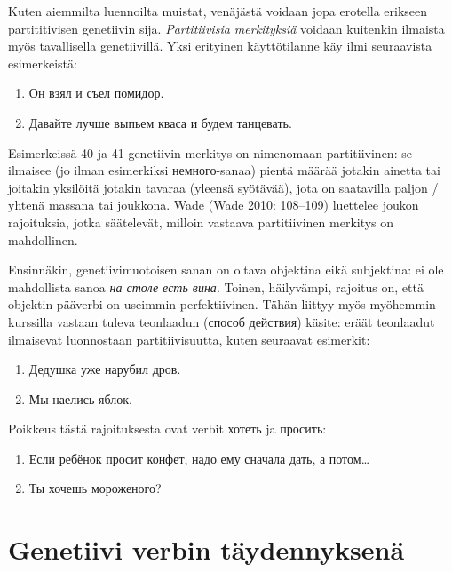 \documentclass[]{scrreprt}
\providecommand{\tightlist}{%
  \setlength{\itemsep}{0pt}\setlength{\parskip}{0pt}}
\begin{document}
Kuten aiemmilta luennoilta muistat, venäjästä voidaan jopa erotella
erikseen partititivisen genetiivin sija. \emph{Partitiivisia
merkityksiä} voidaan kuitenkin ilmaista myös tavallisella genetiivillä.
Yksi erityinen käyttötilanne käy ilmi seuraavista esimerkeistä:

\begin{enumerate}
\def\labelenumi{(\arabic{enumi})}
\setcounter{enumi}{39}
\tightlist
\item
  Он взял и съел помидор.
\item
  Давайте лучше выпьем кваса и будем танцевать.
\end{enumerate}

Esimerkeissä 40 ja 41 genetiivin merkitys on nimenomaan partitiivinen:
se ilmaisee (jo ilman esimerkiksi немного-sanaa) pientä määrää jotakin
ainetta tai joitakin yksilöitä jotakin tavaraa (yleensä syötävää), jota
on saatavilla paljon / yhtenä massana tai joukkona. Wade (Wade 2010:
108--109) luettelee joukon rajoituksia, jotka säätelevät, milloin
vastaava partitiivinen merkitys on mahdollinen.

Ensinnäkin, genetiivimuotoisen sanan on oltava objektina eikä
subjektina: ei ole mahdollista sanoa \emph{на столе есть вина}. Toinen,
häilyvämpi, rajoitus on, että objektin pääverbi on useimmin
perfektiivinen. Tähän liittyy myös myöhemmin kurssilla vastaan tuleva
teonlaadun (способ действия) käsite: eräät teonlaadut ilmaisevat
luonnostaan partitiivisuutta, kuten seuraavat esimerkit:

\begin{enumerate}
\def\labelenumi{(\arabic{enumi})}
\setcounter{enumi}{41}
\tightlist
\item
  Дедушка уже нарубил дров.
\item
  Мы наелись яблок.
\end{enumerate}

Poikkeus tästä rajoituksesta ovat verbit хотеть ja просить:

\begin{enumerate}
\def\labelenumi{(\arabic{enumi})}
\setcounter{enumi}{43}
\tightlist
\item
  Если ребёнок просит конфет, надо ему сначала дать, а потом\ldots{}
\item
  Ты хочешь мороженого?
\end{enumerate}

\section{Genetiivi verbin
täydennyksenä}\label{genetiivi-verbin-tuxe4ydennyksenuxe4}
\end{document}
